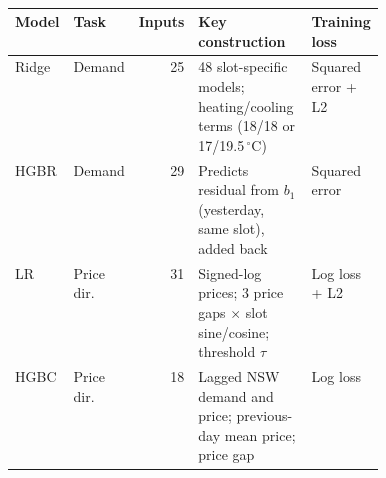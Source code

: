 \begin{table}[htbp]
    \centering
    \small
    \caption{} %
    \label{tab:p1-models}
    \begingroup
    \setlength{\tabcolsep}{3pt}
    \begin{tabular}{@{}llrp{0.43\linewidth}l@{}}
        \hline
        Model & Task & Inputs & Key construction & Training loss \\
        \hline
        Ridge & Demand & 25 & 48 slot-specific models; heating/cooling terms (18/18 or 17/19.5\,$^{\circ}$C) & Squared error + L2~\cite{p1HoerlKennard1970} \\
        HGBR & Demand & 29 & Predicts residual from $b_1$ (yesterday, same slot), added back & Squared error~\cite{p3Friedman2001,p1SklearnHistGradientBoosting} \\
        LR & Price dir. & 31 & Signed-log prices; 3 price gaps $\times$ slot sine/cosine; threshold $\tau$ & Log loss + L2~\cite{p1Cox1958} \\
        HGBC & Price dir. & 18 & Lagged NSW demand and price; previous-day mean price; price gap & Log loss~\cite{p3Friedman2001,p1SklearnHistGradientBoosting} \\
        \hline
    \end{tabular}
    \endgroup
\end{table}
